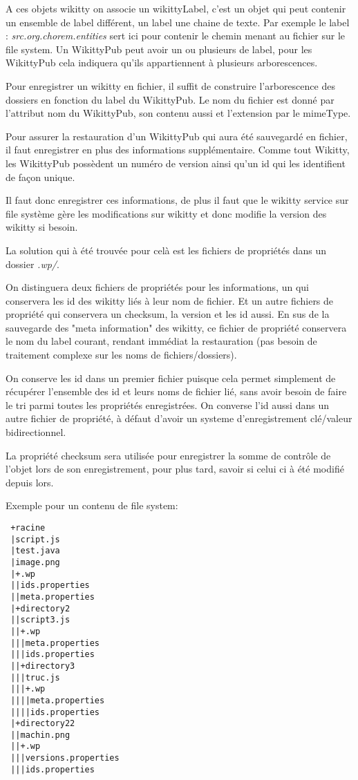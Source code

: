 A ces objets wikitty on associe un wikittyLabel, c'est un objet qui peut
contenir un ensemble de label différent, un label une chaine de texte.
Par exemple le label : \emph{src.org.chorem.entities} sert ici pour contenir le
chemin menant au fichier sur le file system. Un WikittyPub peut avoir un ou
plusieurs de label, pour les WikittyPub cela indiquera qu'ils appartiennent à
plusieurs arborescences.

Pour enregistrer un wikitty en fichier, il suffit de construire l'arborescence
des dossiers en fonction du label du WikittyPub. Le nom du fichier est donné
par l'attribut nom du WikittyPub, son contenu aussi et l'extension par le mimeType.

Pour assurer la restauration d'un WikittyPub qui aura été sauvegardé en fichier,
il faut enregistrer en plus des informations supplémentaire. Comme tout Wikitty,
les WikittyPub possèdent un numéro de version ainsi qu'un id qui les identifient
de façon unique.

Il faut donc enregistrer ces informations, de plus il faut que le wikitty
service sur file système gère les modifications sur wikitty et donc modifie la
version des wikitty si besoin.

La solution qui à été trouvée pour celà est les fichiers de propriétés dans un
dossier \emph{.wp/}. 

On distinguera deux fichiers de propriétés pour les informations, un qui 
conservera les id des wikitty liés à leur nom de fichier. Et un autre fichiers de
propriété qui conservera un checksum, la version et les id aussi. En sus de
la sauvegarde des "meta information" des wikitty, ce fichier de propriété
conservera le nom du label courant, rendant immédiat la restauration (pas
besoin de traitement complexe sur les noms de fichiers/dossiers).

On conserve les id dans un premier fichier puisque cela permet simplement de 
récupérer l'ensemble des id et leurs noms de fichier lié, sans avoir besoin de 
faire le tri parmi toutes les propriétés enregistrées. On converse l'id aussi 
dans un autre fichier de propriété, à défaut d'avoir un systeme d'enregistrement
clé/valeur bidirectionnel. 

La propriété checksum sera utilisée pour enregistrer la somme de contrôle de 
l'objet lors de son enregistrement, pour plus tard, savoir si celui ci à été
modifié depuis lors.

Exemple pour un contenu de file system:
\begin{verbatim}
 +racine
 |script.js
 |test.java
 |image.png
 |+.wp
 ||ids.properties 
 ||meta.properties 
 |+directory2
 ||script3.js
 ||+.wp
 |||meta.properties
 |||ids.properties 
 ||+directory3
 |||truc.js
 |||+.wp
 ||||meta.properties
 ||||ids.properties 
 |+directory22
 ||machin.png
 ||+.wp
 |||versions.properties
 |||ids.properties 
\end{verbatim}


